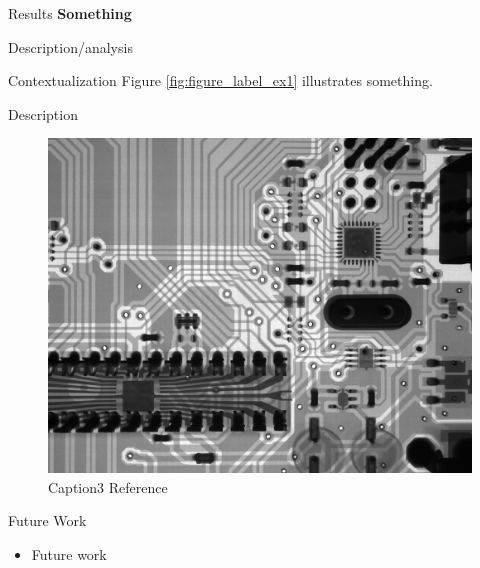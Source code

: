 \documentclass[final]{beamer}
\newlength{\onecolwid}
\newlength{\threecolwid}
\begin{document}
\begin{frame}[t]
\begin{columns}[t,totalwidth=\threecolwid]
\begin{column}{\onecolwid}
\begin{block}{Results}
\textbf{Something}

Description/analysis
 
Contextualization
Figure \ref{fig:figure_label_ex1} illustrates something.

Description

\begin{figure}
	\label{fig:figure_label_ex3}
	\includegraphics[width=0.9\linewidth]{graphic_name3}
	\caption{Caption3 Reference \cite{call_tag_article}}
\end{figure}

\end{block}

\begin{alertblock}{Future Work }
\begin{itemize}
		\item Future work
\end{itemize}

\end{alertblock}





\end{column}
\end{columns}
\end{frame}
\end{document}
